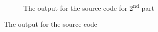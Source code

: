 \documentclass[a4paper,12pt]{article}
\newcommand\nd{\textsuperscript{nd}\xspace}
\begin{document}
\begin{appendices}
\begin{figure}[H]
\begin{subfigure}{.5\textwidth}
		\caption{\label{fig:y1y2a} The output for the source code for 2\nd part}
	\end{subfigure}
	\caption{\label{fig:y1y2ab} The output for the source code }
\end{figure}




\end{appendices}
\end{document}
